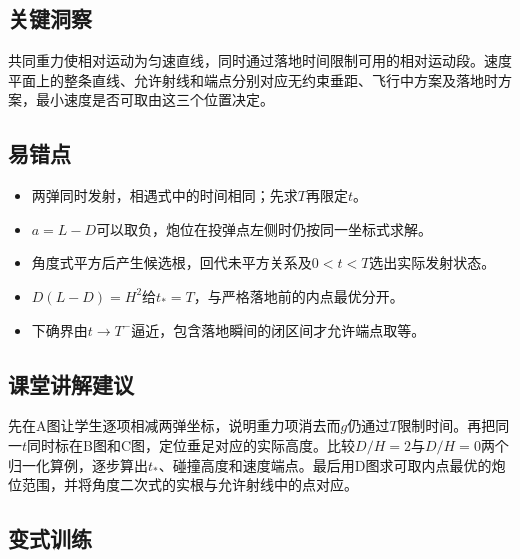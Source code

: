 \documentclass[UTF8,fontset=fandol,a4paper,11pt]{ctexart}
\begin{document}

\subsection*{关键洞察}

共同重力使相对运动为匀速直线，同时通过落地时间限制可用的相对运动段。速度平面上的整条直线、允许射线和端点分别对应无约束垂距、飞行中方案及落地时方案，最小速度是否可取由这三个位置决定。



\subsection*{易错点}

\begin{itemize}
\item 两弹同时发射，相遇式中的时间相同；先求$T$再限定$t$。
\item $a=L-D$可以取负，炮位在投弹点左侧时仍按同一坐标式求解。
\item 角度式平方后产生候选根，回代未平方关系及$0<t<T$选出实际发射状态。
\item $D(L-D)=H^2$给$t_*=T$，与严格落地前的内点最优分开。
\item 下确界由$t\to T^-$逼近，包含落地瞬间的闭区间才允许端点取等。\end{itemize}



\subsection*{课堂讲解建议}

先在A图让学生逐项相减两弹坐标，说明重力项消去而$g$仍通过$T$限制时间。再把同一$t$同时标在B图和C图，定位垂足对应的实际高度。比较$D/H=2$与$D/H=0$两个归一化算例，逐步算出$t_*$、碰撞高度和速度端点。最后用D图求可取内点最优的炮位范围，并将角度二次式的实根与允许射线中的点对应。



\subsection*{变式训练}
\end{document}
